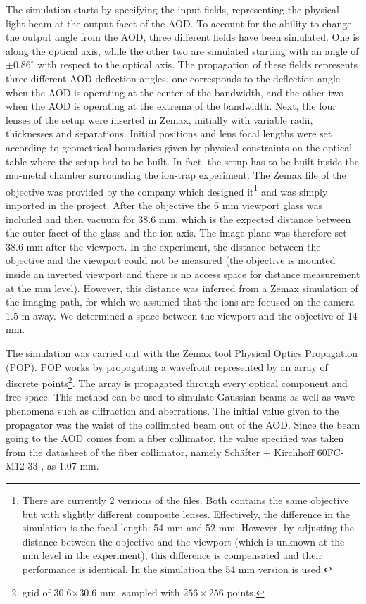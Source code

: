 The simulation starts by specifying the input fields, representing the physical light beam at the output facet of the AOD. To account for the ability to change the output angle from the AOD, three different fields have been simulated. One is along the optical axis, while the other two are simulated starting with an angle of $\pm0.86^{\circ}$ with respect to the optical axis. The propagation of these fields represents three different AOD deflection angles, one corresponds to the deflection angle when the AOD is operating at the center of the bandwidth, and the other two when the AOD is operating at the extrema of the bandwidth. Next, the four lenses of the setup were inserted in Zemax, initially with variable radii, thicknesses and separations. Initial positions and lens focal lengths were set according to geometrical boundaries given by physical constraints on the optical table where the setup had to be built. In fact, the  setup has to be built inside the mu-metal chamber surrounding the ion-trap experiment. The Zemax file of the objective was provided by the company which designed it\footnote{There are currently 2 versions of the files. Both contains the same objective but with slightly different composite lenses. Effectively, the difference in the simulation is the focal length: 54 mm and 52 mm. However, by adjusting the distance between the objective and the viewport (which is unknown at the mm level in the experiment), this difference is compensated and their performance is identical. In the simulation the 54 mm version is used.} and was simply imported in the project. After the objective the 6 mm viewport glass was included and then vacuum for 38.6 mm, which is the expected distance between the outer facet of the glass and the ion axis. The image plane was therefore set 38.6 mm after the viewport. In the experiment, the distance between the objective and the viewport could not be measured (the objective is mounted inside an inverted viewport and there is no access space for distance measurement at the mm level). However, this distance was inferred from a Zemax simulation of the imaging path, for which we assumed that the ions are focused on the camera 1.5 m away. We determined a space between the viewport and the objective of 14 mm.\par
The simulation was carried out with the Zemax tool Physical Optics Propagation (POP). POP works by propagating a wavefront represented by an array of discrete points\footnote{grid of 30.6$\times$30.6 mm, sampled with $256\times256$ points.}. The array is propagated through every optical component and free space. This method can be used to simulate Gaussian beams as well as wave phenomena such as diffraction and aberrations. The initial value given to the propagator was the waist of the collimated beam out of the AOD. Since the beam going to the AOD comes from a fiber collimator, the value specified was taken from the datasheet of the fiber collimator, namely Sch\"after + Kirchhoff 60FC-M12-33 \cite{fibercollimator}, as 1.07 mm.
